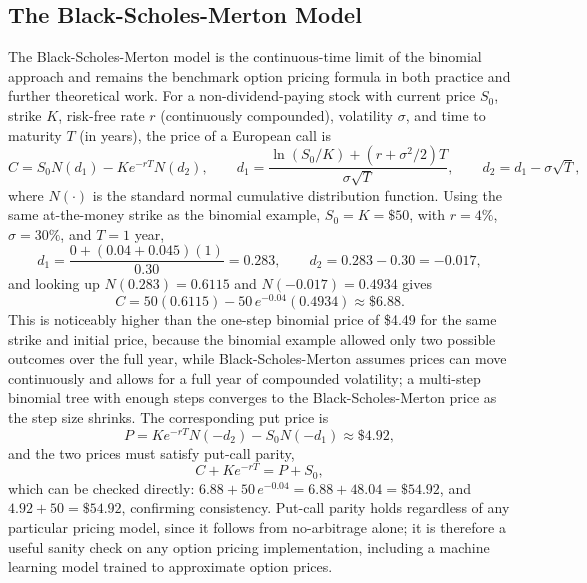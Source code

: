 \documentclass[../ai_in_finance]{subfiles}
\begin{document}
\subsection{The Black-Scholes-Merton Model}

The Black-Scholes-Merton model is the continuous-time limit of the binomial approach and remains the benchmark option pricing formula in both practice and further theoretical work. For a non-dividend-paying stock with current
price $S_0$, strike $K$, risk-free rate $r$ (continuously compounded), volatility $\sigma$, and time to maturity $T$ (in years), the price of a European call is
\begin{equation*}
C = S_0 N(d_1) - K e^{-rT} N(d_2), \qquad
d_1 = \frac{\ln(S_0/K) + (r+\sigma^2/2)T}{\sigma\sqrt{T}}, \qquad
d_2 = d_1 - \sigma\sqrt{T},
\end{equation*}
where $N(\cdot)$ is the standard normal cumulative distribution function. Using the same at-the-money strike as the binomial example, $S_0 = K = \$50$, with $r = 4\%$, $\sigma = 30\%$, and $T = 1$ year,
\begin{equation*}
d_1 = \frac{0 + (0.04+0.045)(1)}{0.30} = 0.283, \qquad d_2 = 0.283 - 0.30 = -0.017,
\end{equation*}
and looking up $N(0.283) = 0.6115$ and $N(-0.017) = 0.4934$ gives
\begin{equation*}
C = 50(0.6115) - 50\,e^{-0.04}(0.4934) \approx \$6.88.
\end{equation*}
This is noticeably higher than the one-step binomial price of \$4.49 for the same strike and initial price, because the binomial example allowed only two possible outcomes over the full year,
while Black-Scholes-Merton assumes prices can move continuously and allows for a full year of compounded volatility; a multi-step binomial tree with enough steps converges to the Black-Scholes-Merton price as the step size shrinks.
The corresponding put price is
\begin{equation*}
P = K e^{-rT} N(-d_2) - S_0 N(-d_1) \approx \$4.92,
\end{equation*}
and the two prices must satisfy put-call parity,
\begin{equation*}
C + K e^{-rT} = P + S_0,
\end{equation*}
which can be checked directly: $6.88 + 50\,e^{-0.04} = 6.88 + 48.04 = \$54.92$, and $4.92 + 50 = \$54.92$, confirming consistency. Put-call parity holds regardless of any particular pricing model, since it follows from no-arbitrage alone;
it is therefore a useful sanity check on any option pricing implementation, including a machine learning model trained to approximate option prices.
\end{document}
